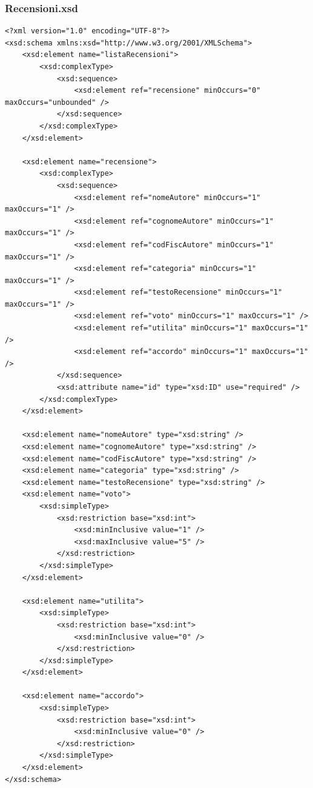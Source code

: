 \documentclass [a4paper, 12pt]{book}
\begin{document}
\subsubsection{Recensioni.xsd}
\begin{lstlisting}[style=XML]
<?xml version="1.0" encoding="UTF-8"?>
<xsd:schema xmlns:xsd="http://www.w3.org/2001/XMLSchema">
    <xsd:element name="listaRecensioni">
        <xsd:complexType>
            <xsd:sequence>
                <xsd:element ref="recensione" minOccurs="0" maxOccurs="unbounded" />
            </xsd:sequence>
        </xsd:complexType>
    </xsd:element>

    <xsd:element name="recensione">
        <xsd:complexType>
            <xsd:sequence>
                <xsd:element ref="nomeAutore" minOccurs="1" maxOccurs="1" />
                <xsd:element ref="cognomeAutore" minOccurs="1"  maxOccurs="1" />
                <xsd:element ref="codFiscAutore" minOccurs="1" maxOccurs="1" />
                <xsd:element ref="categoria" minOccurs="1" maxOccurs="1" />
                <xsd:element ref="testoRecensione" minOccurs="1" maxOccurs="1" />
                <xsd:element ref="voto" minOccurs="1" maxOccurs="1" />
                <xsd:element ref="utilita" minOccurs="1" maxOccurs="1" />
                <xsd:element ref="accordo" minOccurs="1" maxOccurs="1" />
            </xsd:sequence>
            <xsd:attribute name="id" type="xsd:ID" use="required" />
        </xsd:complexType>
    </xsd:element>

    <xsd:element name="nomeAutore" type="xsd:string" />
    <xsd:element name="cognomeAutore" type="xsd:string" />
    <xsd:element name="codFiscAutore" type="xsd:string" />
    <xsd:element name="categoria" type="xsd:string" />
    <xsd:element name="testoRecensione" type="xsd:string" />
    <xsd:element name="voto">
        <xsd:simpleType>
            <xsd:restriction base="xsd:int">
                <xsd:minInclusive value="1" />
                <xsd:maxInclusive value="5" />
            </xsd:restriction>
        </xsd:simpleType>
    </xsd:element>

    <xsd:element name="utilita">
        <xsd:simpleType>
            <xsd:restriction base="xsd:int">
                <xsd:minInclusive value="0" />
            </xsd:restriction>
        </xsd:simpleType>
    </xsd:element>

    <xsd:element name="accordo">
        <xsd:simpleType>
            <xsd:restriction base="xsd:int">
                <xsd:minInclusive value="0" />
            </xsd:restriction>
        </xsd:simpleType>
    </xsd:element>
</xsd:schema>
\end{lstlisting}
\end{document}
